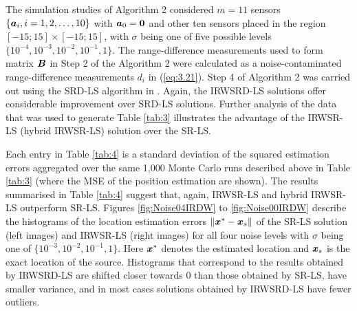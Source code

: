 The simulation studies of Algorithm 2 considered $m = 11$ sensors $\{\mbox{\boldmath$a$}_i, i=1, 2,\ldots,10\}$ with $\mbox{\boldmath$a$}_0=\mbox{\boldmath{$0$}}$ and other ten sensors placed in the region $[-15;15]\times[-15;15]$, with $\sigma$ being one of five possible levels $\{10^{-4}, 10^{-3}, 10^{-2}, 10^{-1}, 1\}$. The range-difference measurements used to form  matrix $\mbox{\boldmath$B$}$ in Step 2 of the Algorithm 2 were calculated as a noise-contaminated range-difference measurements $d_i$ in (\ref{eq:3.21}).%
Step 4 of Algorithm 2 was carried out using the SRD-LS algorithm in \cite{BeckStLi}. Again, the IRWSRD-LS solutions offer considerable improvement over SRD-LS solutions. Further analysis of the data that was used to generate Table \ref{tab:3} illustrates the advantage of the IRWSR-LS (hybrid IRWSR-LS) solution over the SR-LS.

Each entry in Table \ref{tab:4} is a standard deviation of the squared  estimation errors  aggregated over the  same 1,000 Monte Carlo runs described above in Table \ref{tab:3} (where the MSE of the position estimation are shown). The results summarised in Table \ref{tab:4} suggest that, again, IRWSR-LS and hybrid IRWSR-LS outperform SR-LS. Figures \ref{fig:Noise04IRDW} to \ref{fig:Noise00IRDW} describe the histograms of the location estimation errors $\|\mbox{\boldmath$x$}^* - \mbox{\boldmath$x$}_s\|$ of the SR-LS solution (left images) and IRWSR-LS (right images) for all four noise levels with $\sigma$ being one of $\{10^{-3}, 10^{-2}, 10^{-1}, 1\}$. Here $\mbox{\boldmath$x$}^*$ denotes the estimated location and $\mbox{\boldmath$x$}_s$ is the exact location of the source. Histograms that correspond to the results obtained by IRWSRD-LS are shifted closer towards $0$ than those obtained by SR-LS, have smaller variance, and in most cases solutions obtained by IRWSRD-LS have fewer outliers.



